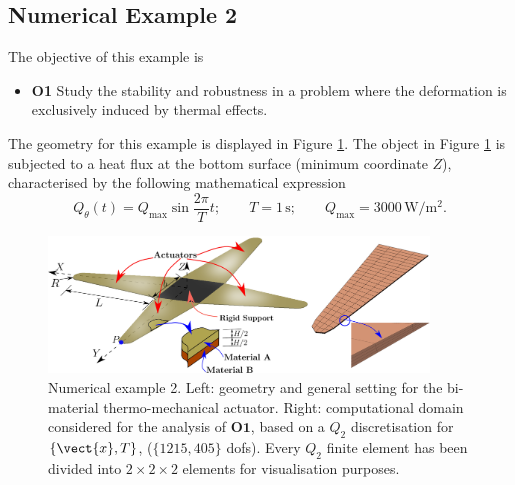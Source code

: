 \newpage


\subsection{Numerical Example 2}

The objective of this example is

\begin{itemize}
	\item \textbf{O1}   Study the stability and robustness in a problem where the deformation is exclusively induced by thermal effects.
	
\end{itemize}	

The geometry for this example is displayed in Figure \ref{fig:Bending actuator geometry}. The object in Figure \ref{fig:Bending actuator geometry} is  subjected to a heat flux at the bottom surface (minimum coordinate $Z$),  characterised by the following mathematical expression
%
\begin{equation}\label{eqn:Heat Flux}
Q_{\theta}(t)=Q_{\text{max}}\sin{\frac{2\pi}{T}t};\qquad T=1\,\text{s};\qquad Q_{\text{max}}=3000\,\mathrm{{W/m^2}}.
\end{equation}


\begin{figure}[hbtp]
	\centering
	\includegraphics[width=0.9\textwidth]{Figures/Example3/TheActuatorAndMeshForStudy.eps}
	\caption{Numerical example 2. Left: geometry and general setting for the bi-material thermo-mechanical actuator. Right: computational domain considered for the analysis of $\textbf{O1}$, based on a  $Q_2$ discretisation for $\{\vect{x},T\}$, ($\{1215,405\}$ dofs). Every $Q_2$ finite element has been divided into $2\times 2\times 2$ elements for visualisation purposes.}
	\label{fig:Bending actuator geometry}
\end{figure}
%

